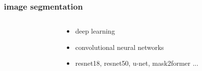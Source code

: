 \documentclass{beamer}
\begin{document}
\begin{frame}
  
  \frametitle{\bf image segmentation}    
  
    \begin{columns}

      \begin{column}{0.5\textwidth}
      \end{column}

      \begin{column}{0.5\textwidth}
        \begin{itemize}
          \item deep learning
          \item convolutional neural networks
          \item resnet18, resnet50, u-net, mask2former ...
        \end{itemize}
      \end{column}

    \end{columns}

\end{frame}
\end{document}
